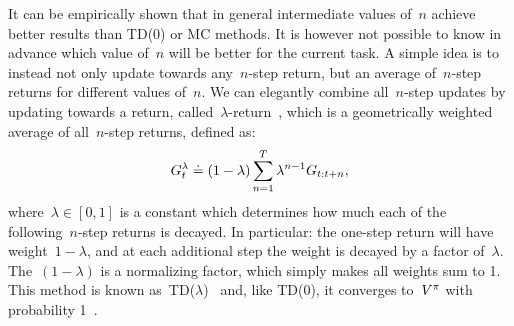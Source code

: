It can be empirically shown that in general intermediate values of~${n}$ achieve better results than TD(0) or MC methods. It is however not possible to know in advance which value of~${n}$ will be better for the current task. A simple idea is to instead not only update towards any~${n}$-step return, but an average of~${n}$-step returns for different values of~${n}$. We can elegantly combine all~${n}$-step updates by updating towards a return, called~${\lambda}$-return~\cite{watkins1989learning}, which is a geometrically weighted average of all~${n}$-step returns, defined as:
\begin{equation}
	G_{t}^{\lambda}\doteq\left(1-\lambda\right)\sum_{n=1}^{T}\lambda^{n-1}G_{t:t+n},
\end{equation}
where~${\lambda\in\left[0,1\right]}$ is a constant which determines how much each of the following~${n}$-step returns is decayed. In particular: the one-step return will have weight~${1-\lambda}$, and at each additional step the weight is decayed by a factor of~${\lambda}$. The~${(1-\lambda)}$ is a normalizing factor, which simply makes all weights sum to 1. This method is known as~TD(${\lambda}$)~\cite{sutton1988td} and, like TD(0), it converges to~${V^{\pi}}$ with probability 1~{\cite{jaakkola1994}}.

